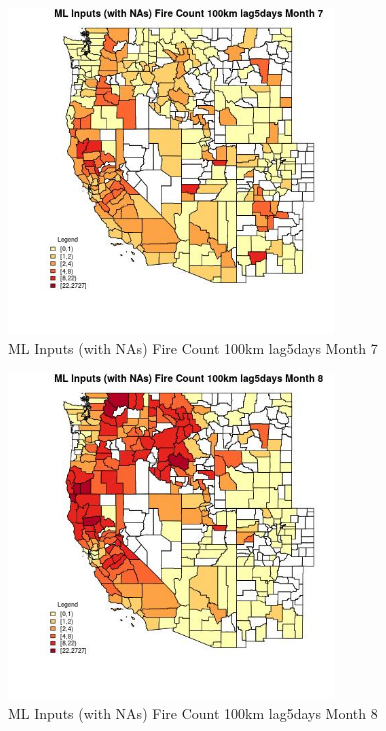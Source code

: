 \clearpage 

\begin{figure} 
\centering  
\includegraphics[width=0.77\textwidth]{Code_Outputs/Report_ML_input_PM25_Step4_part_f_de_duplicated_aves_prioritize_24hr_obswNAs_CountyFire_Count_100km_lag5daysmedianMonth7.jpg} 
\caption{\label{fig:Report_ML_input_PM25_Step4_part_f_de_duplicated_aves_prioritize_24hr_obswNAsCountyFire_Count_100km_lag5daysmedianMonth7}ML Inputs (with NAs) Fire Count 100km lag5days Month 7} 
\end{figure} 
 

\begin{figure} 
\centering  
\includegraphics[width=0.77\textwidth]{Code_Outputs/Report_ML_input_PM25_Step4_part_f_de_duplicated_aves_prioritize_24hr_obswNAs_CountyFire_Count_100km_lag5daysmedianMonth8.jpg} 
\caption{\label{fig:Report_ML_input_PM25_Step4_part_f_de_duplicated_aves_prioritize_24hr_obswNAsCountyFire_Count_100km_lag5daysmedianMonth8}ML Inputs (with NAs) Fire Count 100km lag5days Month 8} 
\end{figure} 
 

